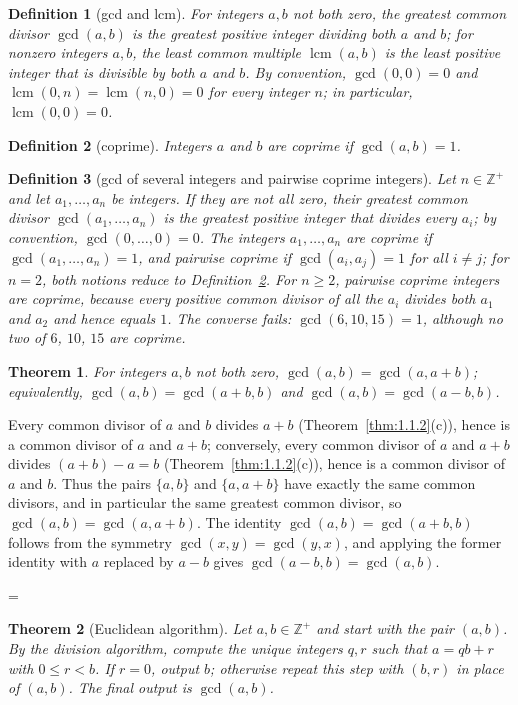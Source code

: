\documentclass[11pt]{article}
\makeatletter
\theoremstyle{ntstyle}
\newtheorem{theorem}{Theorem}[subsection]
\newtheorem{definition}{Definition}[subsection]
\let\nt@closedisplay\]
\def\nt@guardedclose{\@ifnextchar\par{\nt@closeafterpar}{\@ifnextchar\end{\postdisplaypenalty\@M\nt@closedisplay}{\nt@closedisplay}}}
\def\nt@closeafterpar\par{\@ifnextchar\par{\nt@closeafterpar}{\@ifnextchar\end{\postdisplaypenalty\@M\nt@closedisplay\par}{\nt@closedisplay\par}}}
\renewenvironment{proof}[1][\proofname]{\par
  \pushQED{\qed}\normalfont\topsep\medskipamount\edef\nt@afterproof{\@endparpenalty=\the\@endparpenalty\relax}\@beginparpenalty\@M\@endparpenalty\@M\let\]\nt@guardedclose\trivlist\item[]\textit{#1\@addpunct{.}} \ignorespaces}{\ifvmode\addpenalty\@M\fi\popQED\nt@afterproof\endtrivlist\@endpefalse}
\DeclareMathOperator{\lcm}{lcm}
\makeatother
\begin{document}
\begin{definition}[gcd and lcm]\label{def:2.2.1} For integers $a,
		b$ not both zero, the greatest common divisor $\gcd(a, b)$ is the greatest positive integer dividing both $a$ and $b$; for nonzero integers $a, b$,
	the least common multiple $\lcm(a, b)$ is the least positive integer that is
	divisible by both $a$ and $b$. By convention, $\gcd(0, 0)=0$ and $\lcm(0, n)=\lcm(n, 0)=0$
	for every integer $n$; in particular, $\lcm(0, 0)=0$.

\end{definition}
\begin{definition}[coprime]\label{def:2.2.2} Integers $a$ and $b$ are
	coprime if $\gcd(a, b) = 1$.

\end{definition}
\begin{definition}[gcd of several integers and pairwise coprime integers]\label{def:2.2.3} Let
	$n\in\mathbb{Z}^+$ and let $a_1, \ldots, a_n$ be integers. If they are not all zero,
	their greatest common divisor $\gcd(a_1, \ldots, a_n)$ is the greatest positive
	integer that divides every $a_i$; by convention, $\gcd(0, \ldots, 0)=0$. The
	integers $a_1, \ldots, a_n$ are coprime if $\gcd(a_1, \ldots, a_n)=1$, and pairwise
	coprime if $\gcd(a_i, a_j)=1$ for all $i\neq j$; for $n=2$, both notions reduce
	to Definition~\ref{def:2.2.2}. For $n\ge2$, pairwise coprime integers are coprime,
	because every positive common divisor of all the $a_i$ divides both $a_1$ and
	$a_2$ and hence equals $1$. The converse fails: $\gcd(6, 10, 15)=1$, although
	no two of $6$, $10$, $15$ are coprime.

\end{definition}
\begin{theorem}\label{thm:2.2.1}
	For integers $a, b$ not both zero, $\gcd(a, b) = \gcd(a, a+b)$;
	equivalently, $\gcd(a, b) = \gcd(a+b, b)$ and $\gcd(a, b) = \gcd(a-b, b)$.

\end{theorem}

\begin{proof} Every common divisor of $a$ and $b$ divides
	$a+b$ (Theorem~\ref{thm:1.1.2}(c)), hence is a common divisor of $a$ and $a+b$;
	conversely, every common divisor of $a$ and $a+b$ divides $(a+b) - a =
		b$ (Theorem~\ref{thm:1.1.2}(c)), hence is a common divisor of $a$ and $b$. Thus
	the pairs $\{a, b\}$ and $\{a, a+b\}$ have exactly the same common
	divisors, and in particular the same greatest common divisor, so $\gcd(a, b) =
		\gcd(a, a+b)$. The identity $\gcd(a, b) = \gcd(a+b, b)$ follows from the
	symmetry $\gcd(x, y) = \gcd(y, x)$, and applying the former identity with $a$ replaced by
	$a-b$ gives $\gcd(a-b, b) = \gcd(a, b)$.

\end{proof}
\begin{theorem}[Euclidean algorithm]\label{thm:2.2.2} Let $a, b \in
		\mathbb{Z}^+$ and start with the pair $(a,b)$. By the division
	algorithm, compute the unique integers $q, r$ such that $a = qb + r$
	with $0 \le r < b$. If $r = 0$, output $b$; otherwise repeat this
	step with $(b, r)$ in place of $(a,b)$. The final output is $\gcd(a, b)$.

\end{theorem}
\end{document}
